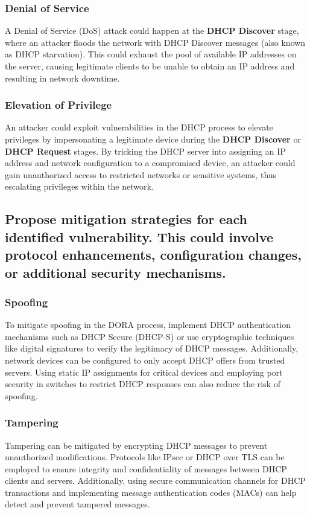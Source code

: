 \documentclass{article}
\begin{document}
\subsubsection{Denial of Service}  
A Denial of Service (DoS) attack could happen at the \textbf{DHCP Discover} stage, where an attacker floods the network with DHCP Discover messages (also known as DHCP starvation). This could exhaust the pool of available IP addresses on the server, causing legitimate clients to be unable to obtain an IP address and resulting in network downtime.

\subsubsection{Elevation of Privilege}  
An attacker could exploit vulnerabilities in the DHCP process to elevate privileges by impersonating a legitimate device during the \textbf{DHCP Discover} or \textbf{DHCP Request} stages. By tricking the DHCP server into assigning an IP address and network configuration to a compromised device, an attacker could gain unauthorized access to restricted networks or sensitive systems, thus escalating privileges within the network.

\subsection{Propose mitigation strategies for each identified vulnerability. This could involve protocol enhancements, configuration changes, or additional security mechanisms.}

\subsubsection{Spoofing}  
To mitigate spoofing in the DORA process, implement DHCP authentication mechanisms such as DHCP Secure (DHCP-S) or use cryptographic techniques like digital signatures to verify the legitimacy of DHCP messages. Additionally, network devices can be configured to only accept DHCP offers from trusted servers. Using static IP assignments for critical devices and employing port security in switches to restrict DHCP responses can also reduce the risk of spoofing.

\subsubsection{Tampering}  
Tampering can be mitigated by encrypting DHCP messages to prevent unauthorized modifications. Protocols like IPsec or DHCP over TLS can be employed to ensure integrity and confidentiality of messages between DHCP clients and servers. Additionally, using secure communication channels for DHCP transactions and implementing message authentication codes (MACs) can help detect and prevent tampered messages.
\end{document}
